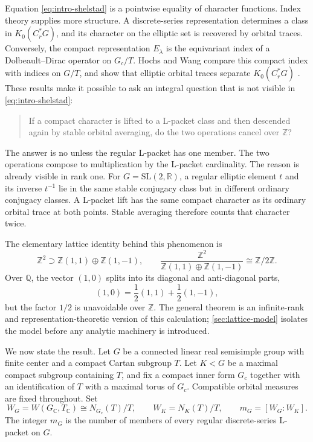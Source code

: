 \documentclass[11pt]{amsart}
\theoremstyle{definition}
\theoremstyle{remark}
\begin{document}
Equation \eqref{eq:intro-shelstad} is a pointwise equality of character
functions.  Index theory supplies more structure.  A discrete-series
representation determines a class in \(K_0(C_r^*G)\), and its character on the
elliptic set is recovered by orbital traces.  Conversely, the compact
representation \(E_\lambda\) is the equivariant index of a Dolbeault--Dirac
operator on \(G_c/T\).  Hochs and Wang compare this compact index with indices
on \(G/T\), and show that elliptic orbital traces separate
\(K_0(C_r^*G)\) \cite[Corollary~4.1 and Theorem~6.4]{HochsWang2019Orbital}.
These results make it possible to ask an integral question that is not visible
in \eqref{eq:intro-shelstad}:
\begin{quote}
If a compact character is lifted to a L-packet class and then descended again
by stable orbital averaging, do the two operations cancel over \(\mathbb Z\)?
\end{quote}

The answer is no unless the regular L-packet has one member.  The two operations
compose to multiplication by the L-packet cardinality.  The reason is already
visible in rank one.  For \(G=\mathrm{SL}(2,\mathbb R)\), a regular elliptic
element \(t\) and its inverse \(t^{-1}\) lie in the same stable conjugacy class
but in different ordinary conjugacy classes.  A L-packet lift has the same
compact character as its ordinary orbital trace at both points.  Stable
averaging therefore counts that character twice.

The elementary lattice identity behind this phenomenon is
\[
  \mathbb Z^2
  \supset
  \mathbb Z(1,1)\oplus\mathbb Z(1,-1),
  \qquad
  \frac{\mathbb Z^2}
  {\mathbb Z(1,1)\oplus\mathbb Z(1,-1)}\cong\mathbb Z/2\mathbb Z.
\]
Over \(\mathbb Q\), the vector \((1,0)\) splits into its diagonal and
anti-diagonal parts,
\[
  (1,0)=\frac12(1,1)+\frac12(1,-1),
\]
but the factor \(1/2\) is unavoidable over \(\mathbb Z\).  The general theorem
is an infinite-rank and representation-theoretic version of this calculation;
\cref{sec:lattice-model} isolates the model before any analytic machinery is
introduced.

We now state the result.  Let \(G\) be a connected linear real semisimple group
with finite center and a compact Cartan subgroup \(T\).  Let \(K<G\) be a
maximal compact subgroup containing \(T\), and fix a compact inner form
\(G_c\) together with an identification of \(T\) with a maximal torus of
\(G_c\).  Compatible orbital measures are fixed throughout.  Set
\[
  W_G=W(G_{\mathbb C},T_{\mathbb C})\cong N_{G_c}(T)/T,
  \qquad
  W_K=N_K(T)/T,
  \qquad
  m_G=[W_G:W_K].
\]
The integer \(m_G\) is the number of members of every regular discrete-series
L-packet on \(G\).
\end{document}
